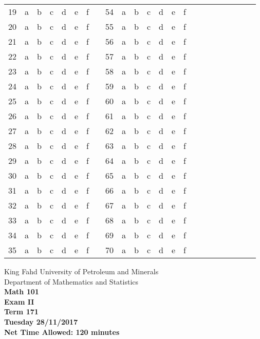 \documentclass[amsfonts,bezier,leqno,fleqn,12pt,a4paper]{article}
\begin{document}
{\begin{normalsize}
\begin{center}
\begin{tabular}{|c|c c c c c c|c|c|c c c c c c|c|c|c c c c c c|}
19 & a & b & c & d & e & f & & 54& a & b & c & d & e & f\\ \cline{1-7}\cline{9-15}
20 & a & b & c & d & e & f & & 55& a & b & c & d & e & f\\ \cline{1-7}\cline{9-15}
21 & a & b & c & d & e & f & & 56& a & b & c & d & e & f\\ \cline{1-7}\cline{9-15}
22 & a & b & c & d & e & f & & 57& a & b & c & d & e & f\\ \cline{1-7}\cline{9-15}
23 & a & b & c & d & e & f & & 58& a & b & c & d & e & f\\ \cline{1-7}\cline{9-15}
24 & a & b & c & d & e & f & & 59& a & b & c & d & e & f\\ \cline{1-7}\cline{9-15}
25 & a & b & c & d & e & f & & 60& a & b & c & d & e & f\\ \cline{1-7}\cline{9-15}
26 & a & b & c & d & e & f & & 61& a & b & c & d & e & f\\ \cline{1-7}\cline{9-15}
27 & a & b & c & d & e & f & & 62& a & b & c & d & e & f\\ \cline{1-7}\cline{9-15}
28 & a & b & c & d & e & f & & 63& a & b & c & d & e & f\\ \cline{1-7}\cline{9-15}
29 & a & b & c & d & e & f & & 64& a & b & c & d & e & f\\ \cline{1-7}\cline{9-15}
30 & a & b & c & d & e & f & & 65& a & b & c & d & e & f\\ \cline{1-7}\cline{9-15}
31 & a & b & c & d & e & f & & 66& a & b & c & d & e & f\\ \cline{1-7}\cline{9-15}
32 & a & b & c & d & e & f & & 67& a & b & c & d & e & f\\ \cline{1-7}\cline{9-15}
33 & a & b & c & d & e & f & & 68& a & b & c & d & e & f\\ \cline{1-7}\cline{9-15}
34 & a & b & c & d & e & f & & 69& a & b & c & d & e & f\\ \cline{1-7}\cline{9-15}
35 & a & b & c & d & e & f & & 70& a & b & c & d & e & f\\ \cline{1-7}\cline{9-15}
\end{tabular}\end{center}
\end{normalsize}
\newpage
\thispagestyle{empty}

\begin{center}
\begin{large}

King Fahd University of Petroleum and Minerals\\
Department of Mathematics and Statistics\\
\vspace*{0.5cm}
{\bf {}} \hfill {\bf Math 101} \hfill {\bf {}} \\
{\bf Exam II}  \\
{\bf Term 171}  \\
{\bf Tuesday 28/11/2017}  \\
{\bf Net Time Allowed: 120 minutes}  \\
\vspace*{0.2cm}


\end{large}
\end{center}}
\end{document}
